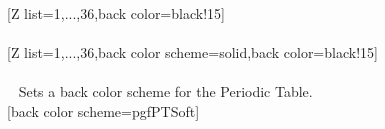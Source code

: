 \\ [5pt][Z list={1,...,36},back color=black!15]%
\\ [10pt]\makebox[\linewidth][c]{\scalebox{.6}{\pgfPT[Z list={1,...,36},back color=black!15]}}%
\\ [10pt][Z list={1,...,36},back color scheme=solid,back color=black!15]%
\\ [10pt]\makebox[\linewidth][c]{\scalebox{.6}{\pgfPT[Z list={1,...,36},back color scheme=solid,back color=black!15]}}%
\\ [5pt]\pgfPTendoption%
\newpage\vspace{-34pt}\ %
\label{option_back color scheme}%
%
{Sets a  back color scheme for the Periodic Table.}%
\\ [2.5pt][back color scheme=pgfPTSoft]%
\\ [2.5pt]\makebox[\linewidth][c]{\scalebox{.6}{\pgfPT[back color scheme=pgfPTSoft]}}%
\vfill
